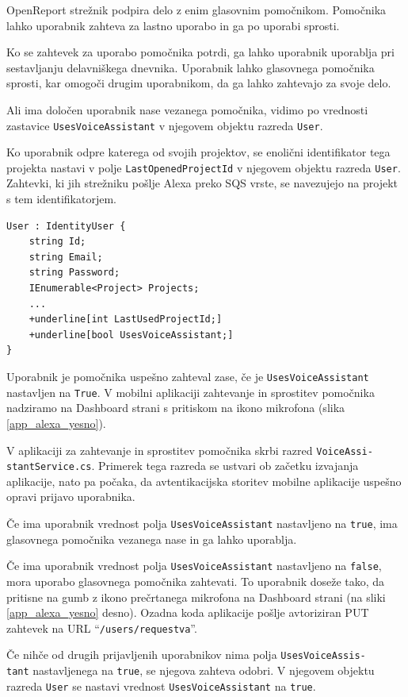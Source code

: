 \documentclass[a4paper, 12pt]{book}
\begin{document}
OpenReport strežnik podpira delo z enim glasovnim pomočnikom.
Pomočnika lahko uporabnik {zahteva} za lastno uporabo in ga po uporabi {sprosti}.

Ko se zahtevek za uporabo pomočnika potrdi, ga lahko uporabnik uporablja pri sestavljanju delavniškega dnevnika.
Uporabnik lahko glasovnega pomočnika sprosti, kar omogoči drugim uporabnikom, da ga lahko zahtevajo za svoje delo.

Ali ima določen uporabnik nase vezanega pomočnika, vidimo po vrednosti zastavice \texttt{UsesVoiceAssistant} v njegovem objektu razreda \texttt{User}.

Ko uporabnik odpre katerega od svojih projektov, se enolični identifikator tega projekta nastavi v polje \texttt{LastOpenedProjectId} v njegovem objektu razreda \texttt{User}.
Zahtevki, ki jih strežniku pošlje Alexa preko SQS vrste, se navezujejo na projekt s tem identifikatorjem.

\begin{Verbatim}[commandchars=+\[\]]
User : IdentityUser {
    string Id; 
    string Email;
    string Password; 
    IEnumerable<Project> Projects;
    ... 
    +underline[int LastUsedProjectId;]
    +underline[bool UsesVoiceAssistant;]
}
\end{Verbatim}

Uporabnik je pomočnika uspešno zahteval zase, če je \texttt{UsesVoiceAssistant} nastavljen na \texttt{True}.
V mobilni aplikaciji zahtevanje in sprostitev pomočnika nadziramo na {Dashboard} strani s pritiskom na ikono mikrofona (slika \ref{app_alexa_yesno}).

V aplikaciji za zahtevanje in sprostitev pomočnika skrbi razred \texttt{VoiceAssi-\\stantService.cs}.
Primerek tega razreda se ustvari ob začetku izvajanja aplikacije, nato pa počaka, da avtentikacijska storitev mobilne aplikacije uspešno opravi prijavo uporabnika.

Če ima uporabnik vrednost polja \texttt{UsesVoiceAssistant} nastavljeno na \texttt{true}, ima glasovnega pomočnika vezanega nase in ga lahko uporablja.

Če ima uporabnik vrednost polja \texttt{UsesVoiceAssistant} nastavljeno na \texttt{false}, mora uporabo glasovnega pomočnika zahtevati.
To uporabnik doseže tako, da pritisne na gumb z ikono prečrtanega mikrofona na Dashboard strani (na sliki \ref{app_alexa_yesno} desno).
Ozadna koda aplikacije pošlje avtoriziran PUT zahtevek na URL \enquote{\texttt{/users/requestva}}.

Če nihče od drugih prijavljenih uporabnikov nima polja \texttt{UsesVoiceAssis-\\tant} nastavljenega na \texttt{true}, se njegova zahteva odobri.
V njegovem objektu razreda \texttt{User} se nastavi vrednost \texttt{UsesVoiceAssistant} na \texttt{true}.
\end{document}
